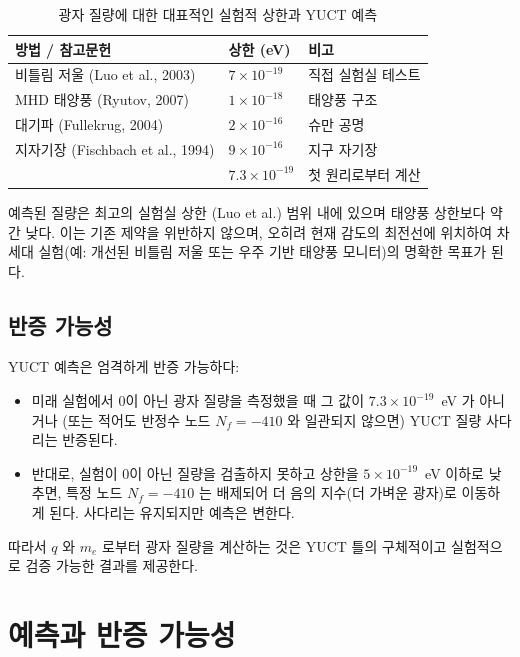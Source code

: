 \documentclass[11pt,a4paper]{article}
\begin{document}
	\begin{table}[H]
		\centering
		\footnotesize
		\caption{광자 질량에 대한 대표적인 실험적 상한과 YUCT 예측}
		\label{tab:photon_limits}
		\begin{tabular}{p{5.2cm}p{2.2cm}p{3.6cm}}
			\toprule
			\textbf{방법 / 참고문헌} & \textbf{상한 (eV)} & \textbf{비고} \\
			\midrule
			비틀림 저울 (Luo et al., 2003) & \(7\times10^{-19}\) & 직접 실험실 테스트 \\
			MHD 태양풍 (Ryutov, 2007) & \(1\times10^{-18}\) & 태양풍 구조 \\
			대기파 (Fullekrug, 2004) & \(2\times10^{-16}\) & 슈만 공명 \\
			지자기장 (Fischbach et al., 1994) & \(9\times10^{-16}\) & 지구 자기장 \\
			\addlinespace
			\multicolumn{1}{c}{\textbf{YUCT 예측}} & \multicolumn{1}{c}{\(7.3\times10^{-19}\)} & 첫 원리로부터 계산 \\
			\bottomrule
		\end{tabular}
	\end{table}
	
	예측된 질량은 최고의 실험실 상한 (Luo et al.) 범위 내에 있으며 태양풍 상한보다 약간 낮다. 이는 기존 제약을 위반하지 않으며, 오히려 현재 감도의 최전선에 위치하여 차세대 실험(예: 개선된 비틀림 저울 또는 우주 기반 태양풍 모니터)의 명확한 목표가 된다.
	
	\subsection{반증 가능성}
	
	YUCT 예측은 엄격하게 반증 가능하다:
	\begin{itemize}
		\item 미래 실험에서 0이 아닌 광자 질량을 측정했을 때 그 값이 \(7.3\times10^{-19}\)~eV 가 아니거나 (또는 적어도 반정수 노드 \(N_f = -410\) 와 일관되지 않으면) YUCT 질량 사다리는 반증된다.
		\item 반대로, 실험이 0이 아닌 질량을 검출하지 못하고 상한을 \(5\times10^{-19}\)~eV 이하로 낮추면, 특정 노드 \(N_f = -410\) 는 배제되어 더 음의 지수(더 가벼운 광자)로 이동하게 된다. 사다리는 유지되지만 예측은 변한다.
	\end{itemize}
	따라서 \(q\) 와 \(m_e\) 로부터 광자 질량을 계산하는 것은 YUCT 틀의 구체적이고 실험적으로 검증 가능한 결과를 제공한다.
	
	\clearpage
	\section{예측과 반증 가능성}
	
\end{document}
